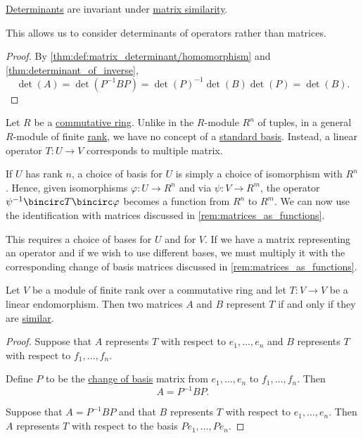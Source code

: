 \begin{proposition}\label{thm:similar_matrices_and_determinants}
  \hyperref[def:matrix_determinant]{Determinants} are invariant under \hyperref[def:similar_matrices]{matrix similarity}.

  This allows us to consider determinants of operators rather than matrices.
\end{proposition}
\begin{proof}
  By \cref{thm:def:matrix_determinant/homomorphism} and \cref{thm:determinant_of_inverse},
  \begin{equation*}
    \det(A) = \det(P^{-1} B P) = \det(P)^{-1} \det(B) \det(P) = \det(B).
  \end{equation*}
\end{proof}

\begin{remark}\label{rem:linear_operators_and_matrices}
  Let \( R \) be a \hyperref[def:ring/commutative]{commutative ring}. Unlike in the \( R \)-module \( R^n \) of tuples, in a general \( R \)-module of finite \hyperref[def:module_rank]{rank}, we have no concept of a \hyperref[def:coordinate_space]{standard basis}. Instead, a linear operator \( T: U \to V \) corresponds to multiple matrix.

  If \( U \) has rank \( n \), a choice of basis for \( U \) is simply a choice of isomorphism with \( R^n \). Hence, given isomorphisms \( \varphi: U \to R^n \) and via \( \psi: V \to R^m \), the operator \( \psi^{-1} \bincirc T \bincirc \varphi \) becomes a function from \( R^n \) to \( R^m \). We can now use the identification with matrices discussed in \cref{rem:matrices_as_functions}.

  This requires a choice of bases for \( U \) and for \( V \). If we have a matrix representing an operator and if we wish to use different bases, we must multiply it with the corresponding change of basis matrices discussed in \cref{rem:matrices_as_functions}.
\end{remark}

\begin{proposition}\label{thm:matrices_of_operator_are_similar}
  Let \( V \) be a module of finite rank over a commutative ring and let \( T: V \to V \) be a linear endomorphism. Then two matrices \( A \) and \( B \) represent \( T \) if and only if they are \hyperref[def:similar_matrices]{similar}.
\end{proposition}
\begin{proof}
  \SufficiencySubProof Suppose that \( A \) represents \( T \) with respect to \( e_1, \ldots, e_n \) and \( B \) represents \( T \) with respect to \( f_1, \ldots, f_n \).

  Define \( P \) to be the \hyperref[con:change_of_basis]{change of basis} matrix from \( e_1, \ldots, e_n \) to \( f_1, \ldots, f_n \). Then
  \begin{equation*}
    A = P^{-1} B P.
  \end{equation*}

  \NecessitySubProof Suppose that \( A = P^{-1} B P \) and that \( B \) represents \( T \) with respect to \( e_1, \ldots, e_n \). Then \( A \) represents \( T \) with respect to the basis \( P e_1, \ldots, P e_n \).
\end{proof}
